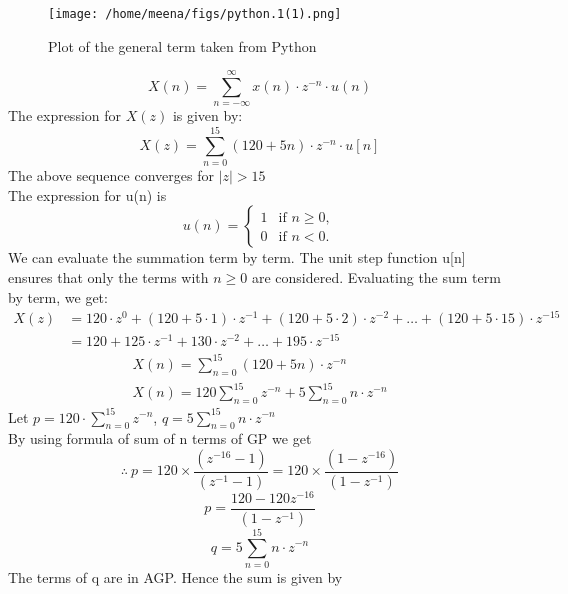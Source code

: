\documentclass[journal,12pt,onecolumn]{IEEEtran}
\theoremstyle{remark}
\begin{document}
\begin{figure}
  \centering
  \texttt{[image: /home/meena/figs/python.1(1).png]} %
  \captionsetup{justification=centering}
  \caption{Plot of the general term taken from Python}
  \label{fig:your_label}
\end{figure}
\[
X(n) = \sum_{n=-\infty}^{\infty} x(n) \cdot z^{-n}\cdot u(n)
\]
The expression for \(X(z)\) is given by:
\[
X(z) = \sum_{n=0}^{15} (120 + 5n) \cdot z^{-n} \cdot u[n]
\]
The above sequence  converges for \(\lvert z \rvert > 15\)\\
The expression for u(n) is 
\[ u(n) = \begin{cases}
    1 & \text{if } n \geq 0, \\
    0 & \text{if } n < 0.
\end{cases} \]
We can evaluate the summation term by term. The unit step function u[n] ensures that only the terms with \(n \geq 0\) are considered.
Evaluating the sum term by term, we get:
\[
\begin{aligned}
X(z) &= 120 \cdot z^0 + (120 + 5 \cdot 1) \cdot z^{-1} + (120 + 5 \cdot 2) \cdot z^{-2} + \ldots + (120 + 5 \cdot 15) \cdot z^{-15} \\
&= 120 + 125 \cdot z^{-1} + 130 \cdot z^{-2} + \ldots + 195 \cdot z^{-15}
\end{aligned}
\]
\[
\begin{aligned}
   X(n) = \sum_{n=0}^{15} (120+5n) \cdot z^{-n}\\
   X(n) = 120\sum_{n=0}^{15}z^{-n}+5\sum_{n=0}^{15}n\cdot z^{-n}
\end{aligned}
\]
Let \(p = 120 \cdot \sum_{n=0}^{15} z^{-n}\), \(q = 5\sum_{n=0}^{15}n\cdot z^{-n}\)\\
By using formula of sum of n terms of GP we get
\[\therefore\ p=120\times \frac{ ( z^{-16}-1)}{(z^{-1}-1)}=120\times \frac{ (1 - z^{-16})}{(1 - z^{-1})} \]
\[p=\frac{120-120 z^{-16}}{(1 - z^{-1})}\]
\[
   q= 5\sum_{n=0}^{15}n\cdot z^{-n}
\]
The terms of q are in AGP. Hence the sum is given by
\end{document}
